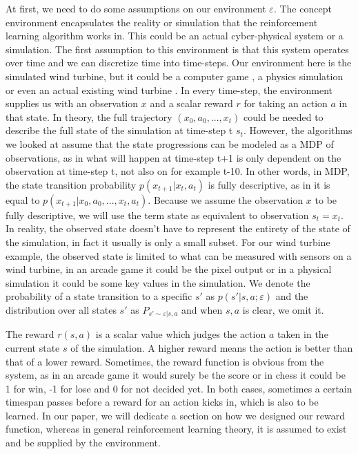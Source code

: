\documentclass[hyperref,final,beleg]{cgvpub}
\begin{document}
At first, we need to do some assumptions on our environment $\varepsilon$. The concept environment encapsulates the reality or simulation that the reinforcement learning algorithm works in. This could be an actual cyber-physical system or a simulation. The first assumption to this environment is that this system operates over time and we can discretize time into time-steps. Our environment here is the simulated wind turbine, but it could be a computer game \cite{lillicrapCONTINUOUSCONTROLDEEP2015}, a physics simulation\cite{brockmanOpenAIGym2016} or even an actual existing wind turbine \cite{kolterDesignAnalysisLearning2012}. 
In every time-step, the environment supplies us with an observation \(x\) and a scalar reward \(r\) for taking an action \(a\) in that state. In theory, the full trajectory \((x_0, a_0, ..., x_t)\) could be needed to describe the full state of the simulation at time-step t \(s_t\). However, the algorithms we looked at assume that the state progressions can be modeled as a \ac{MDP} of observations, as in what will happen at time-step t+1 is only dependent on the observation at time-step t, not also on for example t-10. In other words, in \ac{MDP}, the state transition probability \(p(x_{t+1}|x_t, a_t)\) is fully descriptive, as in it is equal to \(p(x_{t+1}|x_0, a_0, ..., x_t, a_t)\). Because we assume the observation \(x\) to be fully descriptive, we will use the term state as equivalent to observation \(s_t = x_t\). In reality, the observed state doesn't have to represent the entirety of the state of the simulation, in fact it usually is only a small subset. For our wind turbine example, the observed state is limited to what can be measured with sensors on a wind turbine, in an arcade game it could be the pixel output or in a physical simulation it could be some key values in the simulation. We denote the probability of a state transition to a specific $s'$ as $p(s'|s,a;\varepsilon)$ and the distribution over all states $s'$ as $P_{s' \sim \varepsilon | s,a}$ and when $s,a$ is clear, we omit it.

The reward \(r(s,a)\) is a scalar value which judges the action $a$ taken in the current state $s$ of the simulation. A higher reward means the action is better than that of a lower reward. Sometimes, the reward function is obvious from the system, as in an arcade game it would surely be the score or in chess it could be 1 for win, -1 for lose and 0 for not decided yet. In both cases, sometimes a certain timespan passes before a reward for an action kicks in, which is also to be learned. In our paper, we will dedicate a section on how we designed our reward function, whereas in general reinforcement learning theory, it is assumed to exist and be supplied by the environment.
\end{document}
